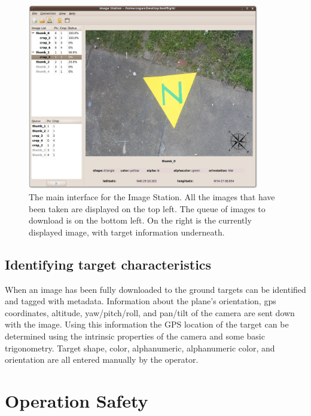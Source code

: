 \documentclass[10pt]{report}
\begin{document}

\begin{figure} [h]
  \centering
  	\includegraphics[width=0.9\textwidth]{../images/ImageStationMain.jpg}
  	\caption[Image Station Interface]{The main interface for the Image Station.  All the images that have been taken are displayed on the top left.  The queue of images to download is on the bottom left.  On the right is the currently displayed image, with target information underneath.}
  	\label{fig:imagestationinterface}
\end{figure}

\subsection{Identifying target characteristics}

When an image has been fully downloaded to the ground targets can be identified and tagged with metadata.  Information about the plane's orientation, gps coordinates, altitude, yaw/pitch/roll, and pan/tilt of the camera are sent down with the image.  Using this information the GPS location of the target can be determined using the intrinsic properties of the camera and some basic trigonometry. Target shape, color, alphanumeric, alphanumeric color, and orientation are all entered manually by the operator.

\section{Operation Safety}
\end{document}

